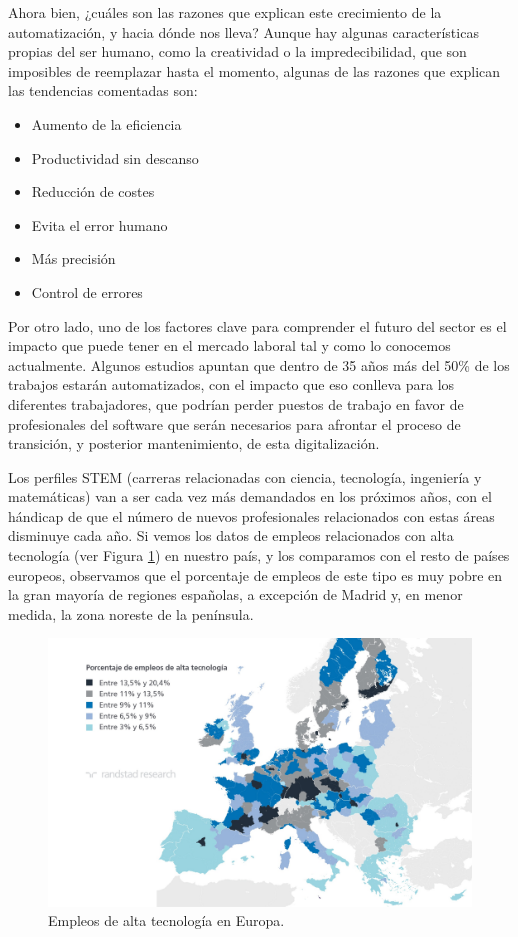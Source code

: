 \documentclass[12pt,spanish,chapterprefix, numbers=noenddot]{book}
\numberwithin{equation}{section}
\numberwithin{figure}{section}
\begin{document}
Ahora bien, ¿cuáles son las razones que explican este crecimiento de la automatización, y hacia dónde nos lleva?  Aunque hay algunas características propias del ser humano, como la creatividad o la impredecibilidad, que son imposibles de reemplazar hasta el momento, algunas de las razones que explican las tendencias comentadas son:
\begin{itemize}
\item Aumento de la eficiencia 
\item Productividad sin descanso
\item Reducción de costes
\item Evita el error humano
\item Más precisión
\item Control de errores
\end{itemize}
Por otro lado, uno de los factores clave para comprender el futuro del sector es el impacto que puede tener en el mercado laboral tal y como lo conocemos actualmente. Algunos estudios \cite{automation_forecast} \cite{mckinsey_automation} apuntan que dentro de 35 años más del 50\% de los trabajos estarán automatizados, con el impacto que eso conlleva para los diferentes trabajadores, que podrían perder puestos de trabajo en favor de profesionales del software que serán necesarios para afrontar el proceso de transición, y posterior mantenimiento, de esta digitalización. 

Los perfiles STEM (carreras relacionadas con ciencia, tecnología, ingeniería y matemáticas) van a ser cada vez más demandados en los próximos años, con el hándicap de que el número de nuevos profesionales relacionados con estas áreas disminuye cada año. 
Si vemos los datos de empleos relacionados con alta tecnología (ver Figura \ref{fig:empleoEur}) en nuestro país, y los comparamos con el resto de países europeos, observamos que el porcentaje de empleos de este tipo es muy pobre en la gran mayoría de regiones españolas, a excepción de Madrid y, en menor medida, la zona noreste de la península. 

\begin{figure}[hbt!]
\centering
\includegraphics[width=12cm]{Figs/empleosTecEur.jpg}
\par
\caption{\label{fig:empleoEur}Empleos de alta tecnología en Europa.}
\end{figure}
\end{document}
